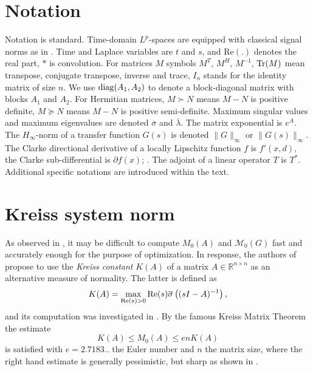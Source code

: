 \documentclass[12pt, a4paper,reqno]{amsart}
\theoremstyle{definition}
\begin{document}
\section*{Notation} Notation is standard. Time-domain $L^p$-spaces are equipped with classical signal norms as in \cite{induced_norms}.  
Time and  Laplace variables are $t$ and $s$, and Re$(.)$ denotes the real part,  
$\ast$ is convolution. For matrices $M$ symbols $M^T$, $M^H$, $M^{-1}$, ${\rm Tr}(M)$ mean transpose, conjugate transpose, inverse and trace, 
$I_n$ stands for the identity matrix of size $n$. We use ${\rm diag}(A_1,A_2)$ to denote 
 a block-diagonal matrix with blocks $A_1$ and $A_2$. For Hermitian matrices, $M \succ N$ means $M-N$
 is positive definite, $M \succeq N$ means $M-N$ is positive semi-definite. Maximum singular values and maximum eigenvalues are denoted
 $\overline{\sigma}$ and $\overline{\lambda}$.  The matrix exponential is $e^ A$. The $H_\infty$-norm of a transfer function $G(s)$
 is denoted $\| G\|_\infty$ or
 $\|G(s)\|_\infty$. The Clarke directional derivative of a locally Lipschitz function $f$ is $f'(x,d)$,
 the Clarke sub-differential is $\partial f(x)$; \cite{clarke1990optimization}.
The adjoint of  a linear operator $T$ is $T^*$. 
Additional specific notations are introduced within the text. 

\section{Kreiss system norm \label{sect-Kreiss}}
As observed  in \cite{leveque}, it may be difficult to compute $M_0(A)$ and  $\mathcal M_0(G)$ fast and accurately enough for 
the purpose of optimization. 
In response, the authors of  \cite{leveque} propose to use the  {\it Kreiss constant} $K(A)$ of a matrix $A \in \mathbb R^{n\times n}$
as an alternative measure of normality. The latter is defined as
\begin{equation}
\label{kreiss}
K(A) = \max_{{\rm Re}(s) > 0} {\rm Re}(s) \overline{\sigma}\left((sI-A)^{-1}\right),
\end{equation}
and its computation was investigated in \cite{mitchell1,mitchell2,an_kreiss}. 
By the famous Kreiss Matrix Theorem \cite[p. 151, p.183]{trefethen_embree} the estimate
\begin{equation}
    \label{estimate}
K(A) \leq M_0(A) \leq en K(A)
\end{equation}
is satisfied with $e=2.7183..$ the Euler number and $n$ the matrix size, 
where the right hand estimate is generally pessimistic, but sharp as shown in \cite{leveque}. 
\end{document}
